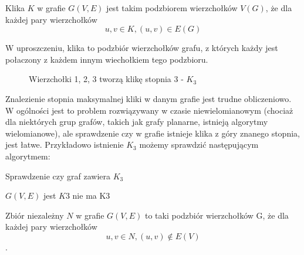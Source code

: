    \begin{definition}[Klika]
    Klika $K$ w grafie $G(V,E)$ jest takim podzbiorem wierzchołków $V(G)$, że dla każdej pary wierzchołków $$u, v \in K, (u, v) \in E(G)$$ 
   \end{definition}
   
   W uproszczeniu, klika to podzbiór wierzchołków grafu, z których każdy jest połaczony z każdem innym wiechołkiem tego podzbioru.
   \begin{figure}[H]
   \centering
     \caption{Wierzchołki 1, 2, 3 tworzą klikę stopnia 3 - $K_3$ }
  \end{figure}

  Znalezienie stopnia maksymalnej kliki w danym grafie jest trudne obliczeniowo.
  W ogólności jest to problem rozwiązywany w czasie niewielomianowym (chociaż dla niektórych grup grafów, 
  takich jak grafy planarne, istnieją algorytmy wielomianowe), ale sprawdzenie czy w grafie istnieje klika
  z góry znanego stopnia, jest łatwe. Przykładowo istnienie $K_3$ możemy sprawdzić następującym algorytmem:
  
  \begin{algorithm}
    \caption{Sprawdzenie czy graf zawiera $K_3$}
    \begin{algorithmic}
    \REQUIRE $G(V, E) $
          \STATE \RETURN jest $K3$
        \ENDIF
      \ENDFOR
    \ENDFOR
    \STATE \RETURN nie ma K3
    \end{algorithmic}
  \end{algorithm}

  \begin{definition}
    Zbiór niezależny $N$ w grafie $G(V,E)$ to taki podzbiór wierzchołków G, że dla każdej pary wierzchołków $$u, v \in N, (u, v) \notin E(V) $$. 
  \end{definition}


